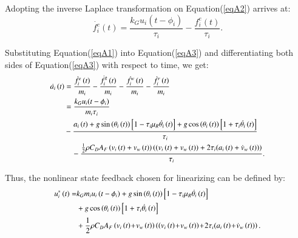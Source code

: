 \documentclass[journal]{IEEEtran}
\begin{document}
Adopting the inverse Laplace transformation on Equation(\ref{eqA2}) arrives at:
\begin{equation}
  \dot{f_i^e}\left(t\right)=\frac{k_Gu_i(t-\phi_i)}{\tau_i}-\frac{f_i^e\left(t\right)}{\tau_i}.
  \label{eqA3}
\end{equation}

Substituting Equation(\ref{eqA1}) into Equation(\ref{eqA3}) and differentiating both sides of Equation(\ref{eqA3}) with respect to time, we get:
\begin{equation}
  \begin{small}
    \begin{aligned}
      \dot{a_i}\left(t\right) & =\frac{\dot{f_i^e}\left(t\right)}{m_i}-\frac{\dot{f_i^g}\left(t\right)}{m_i}-\frac{\dot{f_i^w}\left(t\right)}{m_i}-\frac{\dot{f_i^r}\left(t\right)}{m_i}                                                        \\
                              & =\frac{k_Gu_i(t-\phi_i)}{{m_i\tau}_i}                                                                                                                                                                           \\&-\frac{a_i\left(t\right)+g\sin{\left(\theta_i\left(t\right)\right)}\left[1-\tau_i\mu_R\dot{\theta_i}\left(t\right)\right]+g\cos{\left(\theta_i\left(t\right)\right)}\left[1+\tau_i\dot{\theta_i}\left(t\right)\right]}{\tau_i} \\
                              & \quad -\frac{\frac{1}{2}\rho C_DA_F\left(v_i\left(t\right)+v_w\left(t\right)\right)\left(\left(v_i\left(t\right)+v_w\left(t\right)\right)+2\tau_i(a_i\left(t\right)+\dot{v}_{w}\left(t\right))\right)}{\tau_i}.
    \end{aligned}
    \label{eqA4}
  \end{small}
\end{equation}

Thus, the nonlinear state feedback chosen for linearizing can be defined by:
\begin{equation}
  \begin{small}
    \begin{aligned}
      u_i^\ast\left(t\right)  = & k_Gm_iu_i\left(t-\phi_i\right)+g\sin{\left(\theta_i\left(t\right)\right)}\left[1-\tau_i\mu_R\dot{\theta_i}\left(t\right)\right]                                                                            \\ & +g\cos{\left(\theta_i\left(t\right)\right)}\left[1+\tau_i\dot{\theta_i}\left(t\right)\right] \\
                                & +\frac{1}{2}\rho C_DA_F\left(v_i\left(t\right)\!+\!v_w\left(t\right)\right)\left(\left(v_i\left(t\right)\!+\!v_w\left(t\right)\right)\!+\!2\tau_i(a_i\left(t\right)\!+\!\dot{v}_{w}\left(t\right))\right).
    \end{aligned}
  \end{small}
  \label{eqA5}
\end{equation}
\end{document}
